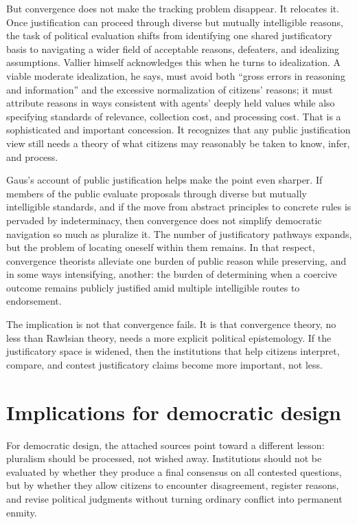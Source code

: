 \documentclass[12pt]{report}
\begin{document}
But convergence does not make the tracking problem disappear. It relocates it. Once justification can proceed through diverse but mutually intelligible reasons, the task of political evaluation shifts from identifying one shared justificatory basis to navigating a wider field of acceptable reasons, defeaters, and idealizing assumptions. Vallier himself acknowledges this when he turns to idealization. A viable moderate idealization, he says, must avoid both \enquote{gross errors in reasoning and information} and the excessive normalization of citizens' reasons; it must attribute reasons in ways consistent with agents' deeply held values while also specifying standards of relevance, collection cost, and processing cost. \parencite[pp.~255--257]{vallier2011diss}
That is a sophisticated and important concession. It recognizes that any public justification view still needs a theory of what citizens may reasonably be taken to know, infer, and process.

Gaus's account of public justification helps make the point even sharper. If members of the public evaluate proposals through diverse but mutually intelligible standards, and if the move from abstract principles to concrete rules is pervaded by indeterminacy, then convergence does not simplify democratic navigation so much as pluralize it. \parencite[pp.~42, 283]{gaus2011order}
The number of justificatory pathways expands, but the problem of locating oneself within them remains. In that respect, convergence theorists alleviate one burden of public reason while preserving, and in some ways intensifying, another: the burden of determining when a coercive outcome remains publicly justified amid multiple intelligible routes to endorsement.

The implication is not that convergence fails. It is that convergence theory, no less than Rawlsian theory, needs a more explicit political epistemology. If the justificatory space is widened, then the institutions that help citizens interpret, compare, and contest justificatory claims become more important, not less.

\section{Implications for democratic design}

For democratic design, the attached sources point toward a different lesson: pluralism should be processed, not wished away. Institutions should not be evaluated by whether they produce a final consensus on all contested questions, but by whether they allow citizens to encounter disagreement, register reasons, and revise political judgments without turning ordinary conflict into permanent enmity.
\end{document}
